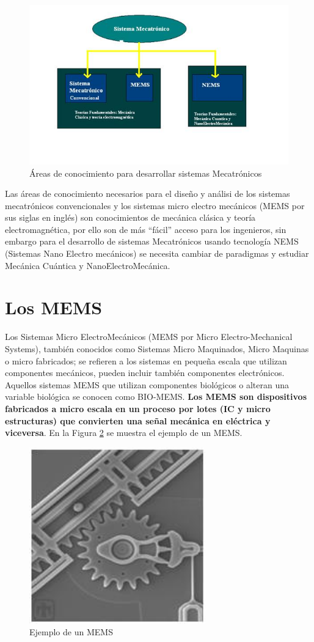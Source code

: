 \documentclass[12pt]{book}
\theoremstyle{definition}
\theoremstyle{remark}
\theoremstyle{plain}
\begin{document}
\begin{figure}
\centering
\includegraphics[width=4.5in]{micromecatronica.jpg}
\caption{Áreas de conocimiento para desarrollar sistemas Mecatrónicos}
\label{fig001}
\end{figure}

Las áreas de conocimiento necesarios para el diseño y análisi de los sistemas mecatrónicos convencionales y los sistemas micro electro mecánicos (MEMS por sus siglas en inglés) son conocimientos de mecánica clásica y teoría electromagnética, por ello son de más “fácil” acceso para los ingenieros, sin embargo para el desarrollo de sistemas Mecatrónicos usando tecnología NEMS (Sistemas Nano Electro mecánicos) se necesita cambiar de paradigmas y estudiar Mecánica Cuántica y NanoElectroMecánica.

\section{Los MEMS}

Los Sistemas Micro ElectroMecánicos (MEMS por Micro Electro-Mechanical Systems), también conocidos como Sistemas Micro Maquinados, Micro Maquinas o micro fabricados; se refieren a los sistemas en pequeña escala que utilizan componentes mecánicos, pueden incluir también componentes electrónicos. Aquellos sistemas MEMS que utilizan componentes biológicos o alteran una variable biológica se conocen como BIO-MEMS.
\textbf{Los MEMS son dispositivos fabricados a micro escala en un proceso por lotes (IC y micro estructuras) que convierten una señal mecánica en eléctrica y viceversa}. En la Figura \ref{fig002} se muestra el ejemplo de un MEMS.

\begin{figure}
\centering
\includegraphics[width=3in]{mems1.jpg}
\caption{Ejemplo de un MEMS}
\label{fig002}
\end{figure}
\end{document}
